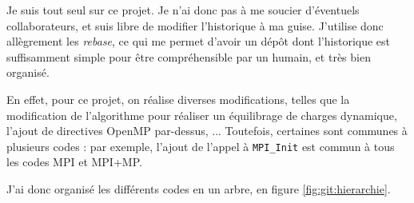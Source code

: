Je suis tout seul sur ce projet. Je n'ai donc pas à me soucier
d'éventuels collaborateurs, et suis libre de modifier l'historique à
ma guise. J'utilise donc allègrement les \emph{rebase}, ce qui me
permet d'avoir un dépôt dont l'historique est suffisamment simple pour
être compréhensible par un humain, et très bien organisé.

En effet, pour ce projet, on réalise diverses modifications, telles
que la modification de l'algorithme pour réaliser un équilibrage de
charges dynamique, l'ajout de directives OpenMP par-dessus,
... Toutefois, certaines sont communes à plusieurs codes : par
exemple, l'ajout de l'appel à \texttt{MPI\_Init} est commun à tous les
codes MPI et MPI+MP.

J'ai donc organisé les différents codes en un arbre, en figure
\ref{fig:git:hierarchie}.

